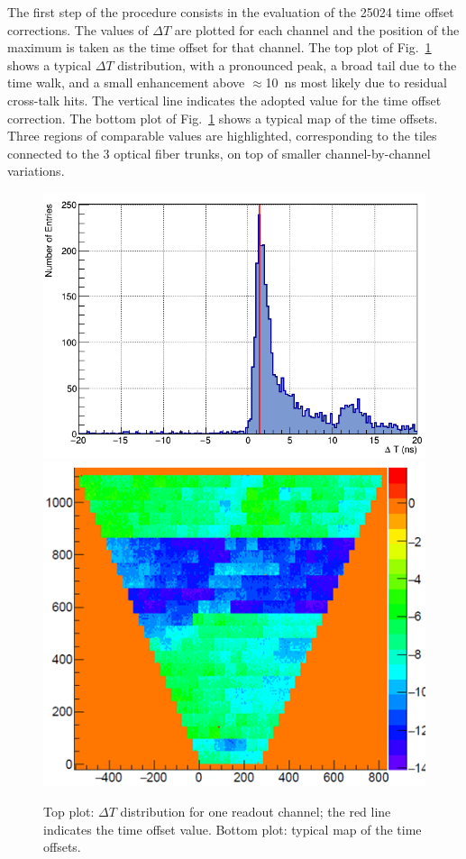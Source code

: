 \documentclass[5p,times,twocolumn]{elsarticle}
\begin{document}
The first step of the procedure consists in the evaluation of the 25024 time offset corrections. The values of
$\Delta T$ are plotted for each channel and the position of the maximum is taken as the time offset for that
channel. The top plot of Fig.~\ref{fig:Toffset} shows a typical $\Delta T$ distribution, with a pronounced peak, a
broad tail due to the time walk, and a small enhancement above $\approx$10~ns most likely due to residual cross-talk
hits. The vertical line indicates the adopted value for the time offset correction. The bottom plot of
Fig.~\ref{fig:Toffset} shows a typical map of the time offsets. Three regions of comparable values are highlighted,
corresponding to the tiles connected to the 3 optical fiber trunks, on top of smaller channel-by-channel variations.

\begin{figure}[t]
\begin{center}
\includegraphics[width=0.9\columnwidth]{Toffset_ch2913.png}
\includegraphics[width=0.9\columnwidth]{ToffsetMap.png}
\end{center}
\caption{Top plot: $\Delta T$ distribution for one readout channel; the red line indicates the time offset value.
  Bottom plot: typical map of the time offsets.}
\label{fig:Toffset}
\end{figure}
\end{document}

